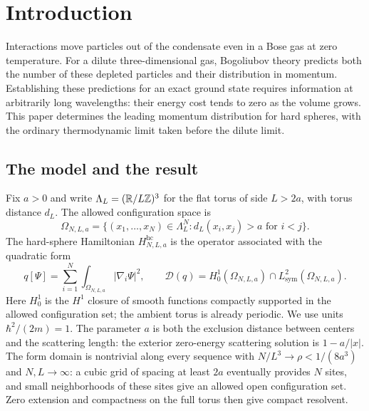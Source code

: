 \section{Introduction}\label{sec:introduction}

Interactions move particles out of the condensate even in a Bose gas at
zero temperature. For a dilute three-dimensional gas, Bogoliubov theory
predicts both the number of these depleted particles and their distribution
in momentum. Establishing these predictions for an exact ground state
requires information at arbitrarily long wavelengths: their energy cost
tends to zero as the volume grows. This paper determines the leading
momentum distribution for hard spheres, with the ordinary thermodynamic
limit taken before the dilute limit.

\subsection{The model and the result}

Fix $a>0$ and write $\Lambda_L=(\mathbb R/L\mathbb Z)^3$ for the flat torus of side
$L>2a$, with torus distance $d_L$. The allowed configuration space is
\[
 \Omega_{N,L,a}=\{(x_1,\ldots,x_N)\in\Lambda_L^N:
                    d_L(x_i,x_j)>a\text{ for }i<j\}.
\]
The hard-sphere Hamiltonian $H^{\mathrm{hc}}_{N,L,a}$ is the operator
associated with the quadratic form
\[
 q[\Psi]=\sum_{i=1}^N\int_{\Omega_{N,L,a}}|\nabla_i\Psi|^2,
 \qquad
 \mathcal D(q)=H_0^1(\Omega_{N,L,a})\cap L^2_{\mathrm{sym}}(\Omega_{N,L,a}).
\]
Here $H_0^1$ is the $H^1$ closure of smooth functions compactly supported
in the allowed configuration set; the ambient torus is already periodic.
We use units $\hbar^2/(2m)=1$. The parameter
$a$ is both the exclusion distance between centers and the scattering
length: the exterior zero-energy scattering solution is $1-a/|x|$.
The form domain is nontrivial along every sequence with
$N/L^3\to\rho<1/(8a^3)$ and $N,L\to\infty$: a cubic grid of spacing
at least $2a$ eventually provides $N$ sites, and small neighborhoods
of these sites give an allowed open configuration set. Zero extension
and compactness on the full torus then give compact resolvent.

